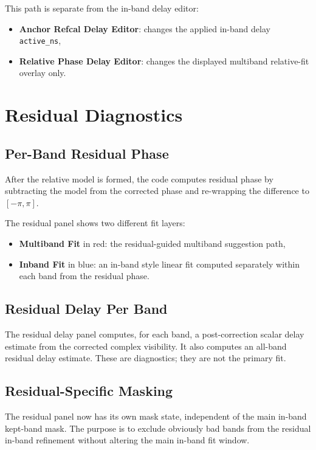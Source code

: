 \documentclass[11pt]{article}
\begin{document}
This path is separate from the in-band delay editor:
\begin{itemize}[leftmargin=1.5em]
  \item \textbf{Anchor Refcal Delay Editor}: changes the applied in-band delay
  \texttt{active\_ns},
  \item \textbf{Relative Phase Delay Editor}: changes the displayed multiband
  relative-fit overlay only.
\end{itemize}

\section{Residual Diagnostics}

\subsection{Per-Band Residual Phase}

After the relative model is formed, the code computes residual phase by
subtracting the model from the corrected phase and re-wrapping the difference to
$[-\pi,\pi]$.

The residual panel shows two different fit layers:
\begin{itemize}[leftmargin=1.5em]
  \item \textbf{Multiband Fit} in red: the residual-guided multiband suggestion
  path,
  \item \textbf{Inband Fit} in blue: an in-band style linear fit computed
  separately within each band from the residual phase.
\end{itemize}

\subsection{Residual Delay Per Band}

The residual delay panel computes, for each band, a post-correction scalar delay
estimate from the corrected complex visibility. It also computes an all-band
residual delay estimate. These are diagnostics; they are not the primary fit.

\subsection{Residual-Specific Masking}

The residual panel now has its own mask state, independent of the main in-band
kept-band mask. The purpose is to exclude obviously bad bands from the residual
in-band refinement without altering the main in-band fit window.
\end{document}
